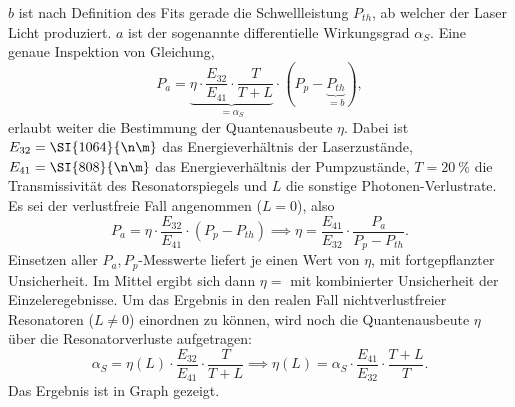 \documentclass[../../../main.tex]{subfiles}
\begin{document}
    $b$ ist nach Definition des Fits gerade die Schwellleistung $P_{th}$, ab welcher der Laser Licht produziert. $a$ ist der sogenannte differentielle Wirkungsgrad $\alpha_S$. Eine genaue Inspektion von Gleichung,
    \[
        P_a = \underbrace{\eta\cdot\frac{E_{32}}{E_{41}}\cdot \frac{T}{T + L}}_{=\alpha_S}\cdot(P_p - \underbrace{P_{th}}_{=b}),
    \]
    erlaubt weiter die Bestimmung der Quantenausbeute $\eta$. Dabei ist $E_{32} = \SI{1064}{\n\m}$ das Energieverhältnis der Laserzustände, $E_{41}= \SI{808}{\n\m}$ das Energieverhältnis der Pumpzustände, $T=\SI{20}{\percent}$ die Transmissivität des Resonatorspiegels und $L$ die sonstige Photonen-Verlustrate. Es sei der verlustfreie Fall angenommen ($L=0$), also 
    \[
        P_a = \eta\cdot\frac{E_{32}}{E_{41}}\cdot(P_p - P_{th}) \implies \eta = \frac{E_{41}}{E_{32}}\cdot \frac{P_a}{P_p - P_{th}}.
    \] 
    Einsetzen aller $P_a, P_p$-Messwerte liefert je einen Wert von $\eta$, mit fortgepflanzter Unsicherheit. Im Mittel ergibt sich dann $\eta = \num{}$ mit kombinierter Unsicherheit der Einzeleregebnisse. Um das Ergebnis in den realen Fall nichtverlustfreier Resonatoren ($L\neq 0$) einordnen zu können, wird noch die Quantenausbeute $\eta$ über die Resonatorverluste aufgetragen:
    \[
        \alpha_S = \eta(L)\cdot\frac{E_{32}}{E_{41}}\cdot\frac{T}{T + L}\implies \eta(L) = \alpha_S\cdot\frac{E_{41}}{E_{32}}\cdot\frac{T + L}{T}.
    \]
    Das Ergebnis ist in Graph gezeigt.
\end{document}
